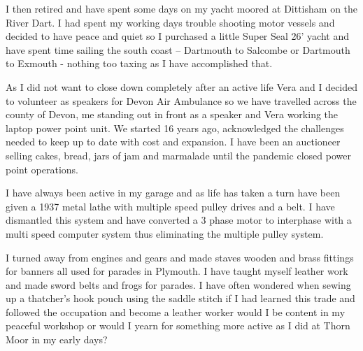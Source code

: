 I then retired and have spent some days on my yacht moored at Dittisham on the
River Dart.  I had spent my working days trouble shooting motor vessels and
decided to have peace and quiet so I purchased a little Super Seal 26' yacht
and have spent  time sailing the south coast – Dartmouth to Salcombe or
Dartmouth to Exmouth - nothing too taxing as I have accomplished that.

As I did not want to close down completely after an active life Vera and I
decided to volunteer as speakers for Devon Air Ambulance so we have travelled
across the county of Devon, me standing out in front as a speaker and Vera
working the laptop power point unit.  We started 16 years ago, acknowledged the
challenges needed to keep up to date with cost and expansion.  I have been an
auctioneer selling cakes, bread, jars of jam and marmalade until the pandemic
closed power point operations.

I have always been active in my garage and as life has taken a turn have been
given a 1937 metal lathe with multiple speed pulley drives and a belt.   I have
dismantled this system and have converted a 3 phase motor to interphase with a
multi speed computer system thus eliminating the multiple pulley system.

I turned away from engines and gears and made staves wooden and brass fittings
for banners all used for parades in Plymouth.  I have taught myself leather
work and made sword belts and frogs for parades.  I have often wondered when
sewing up a thatcher's hook pouch using the saddle stitch if I had learned this
trade and followed the occupation and become a leather worker would I be
content in my peaceful workshop or would I yearn for something more active as I
did at Thorn Moor in my early days?

